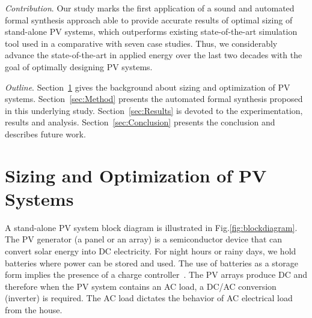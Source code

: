 \documentclass[journal]{IEEEtran}
\begin{document}
\textit{Contribution}. Our study marks the first application of a sound and automated formal synthesis approach able to provide accurate results of optimal sizing of stand-alone PV systems, which outperforms existing state-of-the-art simulation tool used in a comparative with seven case studies. Thus, we considerably advance the state-of-the-art in applied energy over the last two decades with the goal of optimally designing PV systems.

\textit{Outline}. Section~\ref{sec:Background} gives the background about sizing and optimization of PV systems. Section~\ref{sec:Method} presents the automated formal synthesis proposed in this underlying study. Section~\ref{sec:Results} is devoted to the experimentation, results and analysis. Section~\ref{sec:Conclusion} presents the conclusion and describes future work.

\section{Sizing and Optimization of PV Systems}
\label{sec:Background}

A stand-alone PV system block diagram is illustrated in Fig.\ref{fig:blockdiagram}. %
The PV generator (a panel or an array) is a semiconductor device that can convert solar energy into DC electricity. For night hours or rainy days, we hold batteries where power can be stored and used. The use of batteries as a storage form implies the presence of a charge controller~\cite{Hansen}. The PV arrays produce DC and therefore when the PV system contains an AC load, a DC/AC conversion (inverter) is required. The AC load dictates the behavior of AC electrical load from the house. %
\end{document}
